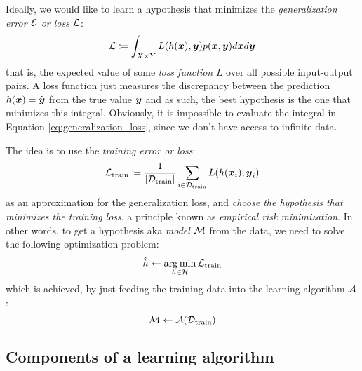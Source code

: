 Ideally, we would like to learn a hypothesis that minimizes the
\emph{generalization error $\mathcal{E}$ or loss $\mathcal{L}$}:
\begin{equation}
	\label{eq:generalization_loss}
	\mathcal{L} \coloneqq \int_{X \times Y} L(h(\boldsymbol{x}), \boldsymbol{y}) p(\boldsymbol{x}, \boldsymbol{y}) d\boldsymbol{x} d\boldsymbol{y}
\end{equation}
that is, the expected value of some \emph{loss function}
$L$ over all possible input-output pairs. A loss function just measures the
discrepancy between the prediction $h(\boldsymbol{x}) = \hat{\boldsymbol{y}}$ from the true value $\boldsymbol{y}$ and
as such, the best hypothesis is the one that minimizes this integral. Obviously,
it is impossible to evaluate the integral in Equation
\ref{eq:generalization_loss}, since we don't have access to infinite data.

The idea is to use the \emph{training error or loss}:
\begin{equation}
	\label{eq:training_loss}
	\mathcal{L}_\text{train} \coloneqq \frac{1}{\lvert \mathcal{D}_\text{train} \rvert} \sum_{i \in \mathcal{D}_\text{train}}
	L(h(\boldsymbol{x}_i), \boldsymbol{y}_i)
\end{equation}
as an approximation for the generalization loss, and \emph{choose the hypothesis
that minimizes the training loss}, a principle known as \emph{empirical risk
minimization}. In other words, to get a
hypothesis aka \emph{model} $\mathcal{M}$ from the data, we need to
solve the following optimization problem:
\begin{equation}
	\label{eq:problem}
	\hat{h} \gets \operatorname*{arg\,min}_{h \in \mathcal{H}} \mathcal{L}_\text{train}
\end{equation}
which is achieved, by just feeding the training data into the learning
algorithm $\mathcal{A}$:
\begin{equation}
	\label{eq:learner}
	\mathcal{M} \gets \mathcal{A}(\mathcal{D}_\text{train})
\end{equation}

\subsection{Components of a learning algorithm}

